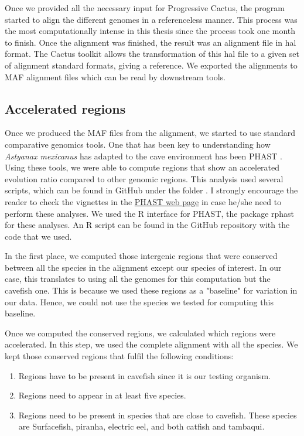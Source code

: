 Once we provided all the necessary input for Progressive Cactus, the program started to align the different genomes in a referenceless manner. This process was the most computationally intense in this thesis since the process took one month to finish. Once the alignment was finished, the result was an alignment file in hal format. The Cactus toolkit allows the transformation of this hal file to a given set of alignment standard formats, giving a reference. We exported the alignments to MAF alignment files which can be read by downstream tools.

\subsection{Accelerated regions}

Once we produced the MAF files from the alignment, we started to use standard comparative genomics tools. One that has been key to understanding how \textit{Astyanax mexicanus} has adapted to the cave environment has been PHAST \parencite{hubisz_phast_2011}. Using these tools, we were able to compute regions that show an accelerated evolution ratio compared to other genomic regions. This analysis used several scripts, which can be found in GitHub under the folder . I strongly encourage the reader to check the vignettes in the \href{http://compgen.cshl.edu/phast/resources.php}{PHAST web page} in case he/she need to perform these analyses. We used the R interface for PHAST, the package rphast for these analyses. An R script can be found in the GitHub repository with the code that we used.

In the first place, we computed those intergenic regions that were conserved between all the species in the alignment except our species of interest. In our case, this translates to using all the genomes for this computation but the cavefish one. This is because we used these regions as a "baseline" for variation in our data. Hence, we could not use the species we tested for computing this baseline.

Once we computed the conserved regions, we calculated which regions were accelerated. In this step, we used the complete alignment with all the species. We kept those conserved regions that fulfil the following conditions:
\begin{enumerate}
    \item Regions have to be present in cavefish since it is our testing organism.
    \item Regions need to appear in at least five species.
    \item Regions need to be present in species that are close to cavefish. These species are Surfacefish, piranha, electric eel, and both catfish and tambaqui.
\end{enumerate}

